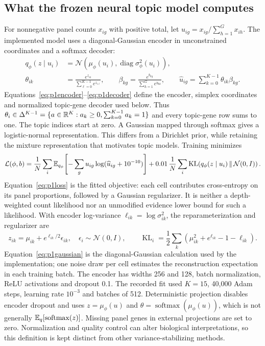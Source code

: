 \subsection{What the frozen neural topic model computes}
For nonnegative panel counts $x_{ig}$ with positive total, let $u_{ig}=x_{ig}/\sum_{h=1}^{G}x_{ih}$. The implemented model uses a diagonal-Gaussian encoder in unconstrained coordinates and a softmax decoder:
\begin{align}
q_\phi(z\mid u_i)&=\mathcal N\!\left(\mu_\phi(u_i),\operatorname{diag}\sigma_\phi^2(u_i)\right),\label{eq:p1encoder}\\
\theta_{ik}&=\frac{e^{z_{ik}}}{\sum_{\ell=0}^{K-1}e^{z_{i\ell}}},\qquad
\beta_{kg}=\frac{e^{b_{kg}}}{\sum_{h=1}^{G}e^{b_{kh}}},\qquad
\widehat u_{ig}=\sum_{k=0}^{K-1}\theta_{ik}\beta_{kg}.\label{eq:p1decoder}
\end{align}
Equations~\eqref{eq:p1encoder}--\eqref{eq:p1decoder} define the encoder, simplex coordinates and normalized topic-gene decoder used below. Thus $\theta_i\in\Delta^{K-1}=\{a\in\mathbb{R}^K:a_k\geq0,\sum_{k=0}^{K-1}a_k=1\}$ and every topic-gene row sums to one. The topic indices start at zero. A Gaussian mapped through softmax gives a logistic-normal representation. This differs from a Dirichlet prior, while retaining the mixture representation that motivates topic models. Training minimizes
\begin{equation}
\mathcal L(\phi,b)=\frac1N\sum_i\mathbb{E}_{q_\phi}\!\left[-\sum_g u_{ig}\log(\widehat u_{ig}+10^{-10})\right]
+0.01\,\frac1N\sum_i\operatorname{KL}\!\left(q_\phi(z\mid u_i)\,\|\,\mathcal N(0,I)\right).\label{eq:p1loss}
\end{equation}
Equation~\eqref{eq:p1loss} is the fitted objective: each cell contributes cross-entropy on its panel proportions, followed by a Gaussian regularizer. It is neither a depth-weighted count likelihood nor an unmodified evidence lower bound for such a likelihood. With encoder log-variance $\ell_{ik}=\log\sigma_{ik}^2$, the reparameterization and regularizer are
\begin{equation}
z_{ik}=\mu_{ik}+e^{\ell_{ik}/2}\epsilon_{ik},\quad \epsilon_i\sim\mathcal N(0,I),\qquad
\operatorname{KL}_i=\frac12\sum_k\left(\mu_{ik}^2+e^{\ell_{ik}}-1-\ell_{ik}\right).\label{eq:p1gaussian}
\end{equation}
Equation~\eqref{eq:p1gaussian} is the diagonal-Gaussian calculation used by the implementation; one noise draw per cell estimates the reconstruction expectation in each training batch. The encoder has widths 256 and 128, batch normalization, ReLU activations and dropout 0.1. The recorded fit used $K=15$, 40,000 Adam steps, learning rate $10^{-3}$ and batches of 512. Deterministic projection disables encoder dropout and uses $z=\mu_\phi(u)$ and $\theta=\operatorname{softmax}(\mu_\phi(u))$, which is not generally $\mathbb{E}_q[\operatorname{softmax}(z)]$. Missing panel genes in external projections are set to zero. Normalization and quality control can alter biological interpretations, so this definition is kept distinct from other variance-stabilizing methods.

